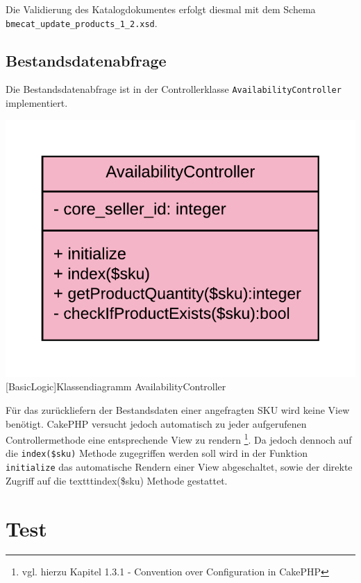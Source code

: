 	Die Validierung des Katalogdokumentes erfolgt diesmal mit dem Schema \texttt{bmecat\_update\_products\_1\_2.xsd}.
	
	\subsection{Bestandsdatenabfrage}
	
	Die Bestandsdatenabfrage ist in der Controllerklasse \texttt{AvailabilityController} implementiert.
	
	\begin{minipage}{\linewidth}
		\vspace{1em}
		\centering
		\includegraphics[width=0.4 \linewidth]{img/AvailabilityController}
		[BasicLogic]{Klassendiagramm AvailabilityController}
		\vspace{1em}
	\end{minipage}
	
	Für das zurückliefern der Bestandsdaten einer angefragten SKU wird keine View benötigt. CakePHP versucht jedoch automatisch zu jeder aufgerufenen Controllermethode eine entsprechende View zu rendern \footnote{vgl. hierzu Kapitel 1.3.1 - Convention over Configuration in CakePHP}.  Da jedoch dennoch auf die \texttt{index(\$sku)} Methode zugegriffen werden soll wird in der Funktion \texttt{initialize} das automatische Rendern einer View abgeschaltet, sowie der direkte Zugriff auf die texttt{index(\$sku)} Methode gestattet.
	
	
	
	
	
	
	
	
	
	
	
	
	
	
	
	
	
	
	
	
	
	
	
	

	
	\section{Test}


	

